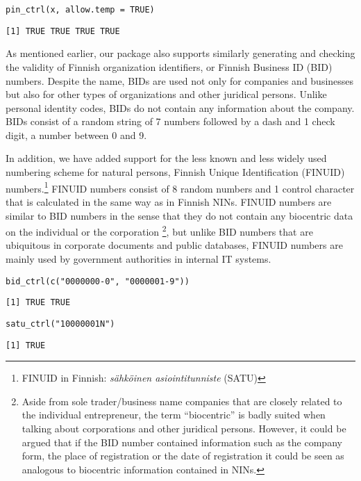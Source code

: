 \begin{verbatim}
pin_ctrl(x, allow.temp = TRUE)
\end{verbatim}

\begin{verbatim}
[1] TRUE TRUE TRUE TRUE
\end{verbatim}

As mentioned earlier, our package also supports similarly generating and checking the validity of Finnish organization identifiers, or Finnish Business ID (BID) numbers. Despite the name, BIDs are used not only for companies and businesses but also for other types of organizations and other juridical persons. Unlike personal identity codes, BIDs do not contain any information about the company. BIDs consist of a random string of 7 numbers followed by a dash and 1 check digit, a number between 0 and 9.

In addition, we have added support for the less known and less widely used numbering scheme for natural persons, Finnish Unique Identification (FINUID) numbers.\footnote{FINUID in Finnish: \emph{sähköinen asiointitunniste} (SATU)} FINUID numbers consist of 8 random numbers and 1 control character that is calculated in the same way as in Finnish NINs. FINUID numbers are similar to BID numbers in the sense that they do not contain any biocentric data on the individual or the corporation \footnote{Aside from sole trader/business name companies that are closely related to the individual entrepreneur, the term ``biocentric'' is badly suited when talking about corporations and other juridical persons. However, it could be argued that if the BID number contained information such as the company form, the place of registration or the date of registration it could be seen as analogous to biocentric information contained in NINs.}, but unlike BID numbers that are ubiquitous in corporate documents and public databases, FINUID numbers are mainly used by government authorities in internal IT systems.

\begin{verbatim}
bid_ctrl(c("0000000-0", "0000001-9"))
\end{verbatim}

\begin{verbatim}
[1] TRUE TRUE
\end{verbatim}

\begin{verbatim}
satu_ctrl("10000001N")
\end{verbatim}

\begin{verbatim}
[1] TRUE
\end{verbatim}

